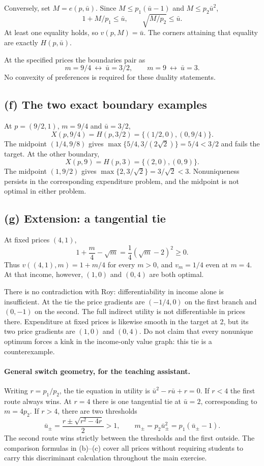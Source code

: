 \documentclass[11pt,a4paper]{article}
\begin{document}
Conversely, set $M=e(p,\bar u)$. Since
$M\le p_1(\bar u-1)$ and $M\le p_2\bar u^2$,
\[
 1+M/p_1\le\bar u,\qquad \sqrt{M/p_2}\le\bar u.
\]
At least one equality holds, so $v(p,M)=\bar u$. The corners attaining
that equality are exactly $H(p,\bar u)$.

At the specified prices the boundaries pair as
\[
 m=9/4\ \longleftrightarrow\ \bar u=3/2,\qquad
 m=9\ \longleftrightarrow\ \bar u=3.
\]
No convexity of preferences is required for these duality statements.

\subsection*{(f) The two exact boundary examples}
At $p=(9/2,1)$, $m=9/4$ and $\bar u=3/2$,
\[
 X(p,9/4)=H(p,3/2)=\{(1/2,0),(0,9/4)\}.
\]
The midpoint $(1/4,9/8)$ gives
$\max\{5/4,3/(2\sqrt2)\}=5/4<3/2$ and fails the target.
At the other boundary,
\[
 X(p,9)=H(p,3)=\{(2,0),(0,9)\}.
\]
The midpoint $(1,9/2)$ gives $\max\{2,3/\sqrt2\}=3/\sqrt2<3$.
Nonuniqueness persists in the corresponding expenditure problem, and the
midpoint is not optimal in either problem.

\subsection*{(g) Extension: a tangential tie}
At fixed prices $(4,1)$,
\[
 1+\frac m4-\sqrt m=\frac14(\sqrt m-2)^2\ge0.
\]
Thus $v((4,1),m)=1+m/4$ for every $m>0$, and $v_m=1/4$ even at $m=4$.
At that income, however, $(1,0)$ and $(0,4)$ are both optimal.

There is no contradiction with Roy: differentiability in income alone is
insufficient. At the tie the price gradients are $(-1/4,0)$ on the first
branch and $(0,-1)$ on the second. The full indirect utility is not
differentiable in prices there. Expenditure at fixed prices is likewise
smooth in the target at 2, but its two price gradients are $(1,0)$ and $(0,4)$.
Do not claim that every nonunique optimum forces a kink in the income-only
value graph: this tie is a counterexample.

\paragraph{General switch geometry, for the teaching assistant.}
Writing $r=p_1/p_2$, the tie equation in utility is
$\bar u^2-r\bar u+r=0$. If $r<4$ the first route always wins. At $r=4$
there is one tangential tie at $\bar u=2$, corresponding to $m=4p_2$.
If $r>4$, there are two thresholds
\[
 \bar u_{\pm}=\frac{r\pm\sqrt{r^2-4r}}2>1,\qquad
 m_{\pm}=p_2\bar u_{\pm}^2=p_1(\bar u_{\pm}-1).
\]
The second route wins strictly between the thresholds and the first outside.
The comparison formulas in (b)--(c) cover all prices without requiring
students to carry this discriminant calculation throughout the main exercise.
\end{document}
